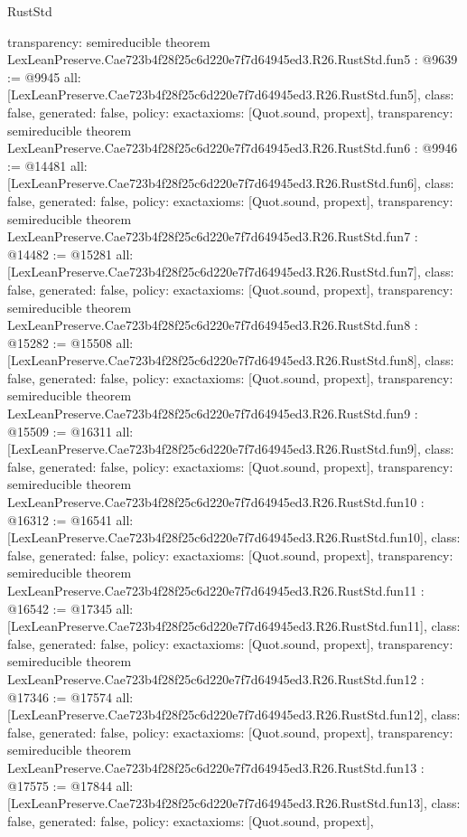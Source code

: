 \begin{lexlean}{RustStd}
\begin{coremodule}
{  transparency: semireducible
}
theorem LexLeanPreserve.Cae723b4f28f25c6d220e7f7d64945ed3.R26.RustStd.fun5 : @9639 := @9945 {
  all: [LexLeanPreserve.Cae723b4f28f25c6d220e7f7d64945ed3.R26.RustStd.fun5],
  class: false,
  generated: false,
  policy: exact{axioms: [Quot.sound, propext]},
  transparency: semireducible
}
theorem LexLeanPreserve.Cae723b4f28f25c6d220e7f7d64945ed3.R26.RustStd.fun6 : @9946 := @14481 {
  all: [LexLeanPreserve.Cae723b4f28f25c6d220e7f7d64945ed3.R26.RustStd.fun6],
  class: false,
  generated: false,
  policy: exact{axioms: [Quot.sound, propext]},
  transparency: semireducible
}
theorem LexLeanPreserve.Cae723b4f28f25c6d220e7f7d64945ed3.R26.RustStd.fun7 : @14482 := @15281 {
  all: [LexLeanPreserve.Cae723b4f28f25c6d220e7f7d64945ed3.R26.RustStd.fun7],
  class: false,
  generated: false,
  policy: exact{axioms: [Quot.sound, propext]},
  transparency: semireducible
}
theorem LexLeanPreserve.Cae723b4f28f25c6d220e7f7d64945ed3.R26.RustStd.fun8 : @15282 := @15508 {
  all: [LexLeanPreserve.Cae723b4f28f25c6d220e7f7d64945ed3.R26.RustStd.fun8],
  class: false,
  generated: false,
  policy: exact{axioms: [Quot.sound, propext]},
  transparency: semireducible
}
theorem LexLeanPreserve.Cae723b4f28f25c6d220e7f7d64945ed3.R26.RustStd.fun9 : @15509 := @16311 {
  all: [LexLeanPreserve.Cae723b4f28f25c6d220e7f7d64945ed3.R26.RustStd.fun9],
  class: false,
  generated: false,
  policy: exact{axioms: [Quot.sound, propext]},
  transparency: semireducible
}
theorem LexLeanPreserve.Cae723b4f28f25c6d220e7f7d64945ed3.R26.RustStd.fun10 : @16312 := @16541 {
  all: [LexLeanPreserve.Cae723b4f28f25c6d220e7f7d64945ed3.R26.RustStd.fun10],
  class: false,
  generated: false,
  policy: exact{axioms: [Quot.sound, propext]},
  transparency: semireducible
}
theorem LexLeanPreserve.Cae723b4f28f25c6d220e7f7d64945ed3.R26.RustStd.fun11 : @16542 := @17345 {
  all: [LexLeanPreserve.Cae723b4f28f25c6d220e7f7d64945ed3.R26.RustStd.fun11],
  class: false,
  generated: false,
  policy: exact{axioms: [Quot.sound, propext]},
  transparency: semireducible
}
theorem LexLeanPreserve.Cae723b4f28f25c6d220e7f7d64945ed3.R26.RustStd.fun12 : @17346 := @17574 {
  all: [LexLeanPreserve.Cae723b4f28f25c6d220e7f7d64945ed3.R26.RustStd.fun12],
  class: false,
  generated: false,
  policy: exact{axioms: [Quot.sound, propext]},
  transparency: semireducible
}
theorem LexLeanPreserve.Cae723b4f28f25c6d220e7f7d64945ed3.R26.RustStd.fun13 : @17575 := @17844 {
  all: [LexLeanPreserve.Cae723b4f28f25c6d220e7f7d64945ed3.R26.RustStd.fun13],
  class: false,
  generated: false,
  policy: exact{axioms: [Quot.sound, propext]},
}
\end{coremodule}
\end{lexlean}
